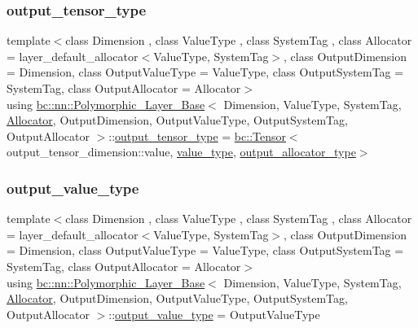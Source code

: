 \subsubsection{\texorpdfstring{output\+\_\+tensor\+\_\+type}{output\_tensor\_type}\hspace{0.1cm}{\footnotesize\ttfamily [2/2]}}
{\footnotesize\ttfamily template$<$class Dimension , class Value\+Type , class System\+Tag , class Allocator  = layer\+\_\+default\+\_\+allocator$<$\+Value\+Type, System\+Tag$>$, class Output\+Dimension  = Dimension, class Output\+Value\+Type  = Value\+Type, class Output\+System\+Tag  = System\+Tag, class Output\+Allocator  = Allocator$>$ \\
using \hyperlink{structbc_1_1nn_1_1Polymorphic__Layer__Base}{bc\+::nn\+::\+Polymorphic\+\_\+\+Layer\+\_\+\+Base}$<$ Dimension, Value\+Type, System\+Tag, \hyperlink{classbc_1_1allocators_1_1Allocator}{Allocator}, Output\+Dimension, Output\+Value\+Type, Output\+System\+Tag, Output\+Allocator $>$\+::\hyperlink{structbc_1_1nn_1_1Polymorphic__Layer__Base_aaa3bdb6355a104df7c68d46fd4ffa15a}{output\+\_\+tensor\+\_\+type} =  \hyperlink{namespacebc_a659391e47ab612be3ba6c18cf9c89159}{bc\+::\+Tensor}$<$output\+\_\+tensor\+\_\+dimension\+::value, \hyperlink{structbc_1_1nn_1_1Polymorphic__Layer__Base_aa7d46845ee0a4544003a6f8fe3b7f52a}{value\+\_\+type}, \hyperlink{structbc_1_1nn_1_1Polymorphic__Layer__Base_a4bc904c1787b9da18e35d0c6b60ac59f}{output\+\_\+allocator\+\_\+type}$>$}

\mbox{\label{structbc_1_1nn_1_1Polymorphic__Layer__Base_a15d1092569f56625cbdf8d7045e66391}} 
\subsubsection{\texorpdfstring{output\+\_\+value\+\_\+type}{output\_value\_type}\hspace{0.1cm}{\footnotesize\ttfamily [1/2]}}
{\footnotesize\ttfamily template$<$class Dimension , class Value\+Type , class System\+Tag , class Allocator  = layer\+\_\+default\+\_\+allocator$<$\+Value\+Type, System\+Tag$>$, class Output\+Dimension  = Dimension, class Output\+Value\+Type  = Value\+Type, class Output\+System\+Tag  = System\+Tag, class Output\+Allocator  = Allocator$>$ \\
using \hyperlink{structbc_1_1nn_1_1Polymorphic__Layer__Base}{bc\+::nn\+::\+Polymorphic\+\_\+\+Layer\+\_\+\+Base}$<$ Dimension, Value\+Type, System\+Tag, \hyperlink{classbc_1_1allocators_1_1Allocator}{Allocator}, Output\+Dimension, Output\+Value\+Type, Output\+System\+Tag, Output\+Allocator $>$\+::\hyperlink{structbc_1_1nn_1_1Polymorphic__Layer__Base_a15d1092569f56625cbdf8d7045e66391}{output\+\_\+value\+\_\+type} =  Output\+Value\+Type}

